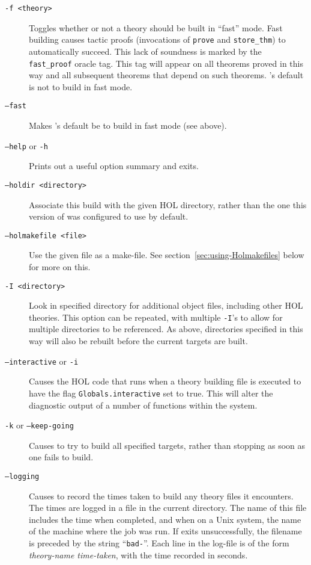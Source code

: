 \begin{description}
\item[\texttt{-f <theory>}] Toggles whether or not a theory should be
  built in ``fast'' mode.  Fast building causes tactic proofs
  (invocations of \texttt{prove} and \texttt{store\_thm}) to
  automatically succeed.  This lack of soundness is marked by the
  \texttt{fast\_proof} oracle tag.  This tag will appear on all
  theorems proved in this way and all subsequent theorems that depend
  on such theorems.  \holmake's default is not to build in fast mode.
\item[\texttt{--fast}] Makes \holmake's default be to build in fast
  mode (see above).
\item[{\tt --help} or {\tt -h}] Prints out a useful option summary and
  exits.
\item[\tt --holdir <directory>] Associate this build with the given
  HOL directory, rather than the one this version of \holmake{} was
  configured to use by default.
\item[\tt --holmakefile <file>] Use the given file as a make-file.
  See section~\ref{sec:using-Holmakefiles} below for more on this.
\item[\tt -I <directory>]
  Look in specified directory for additional object files, including other HOL theories.
  This option can be repeated, with multiple {\tt -I}'s to allow for multiple directories to be referenced.
  As above, directories specified in this way will also be rebuilt before the current targets are built.
\item[\texttt{--interactive} or \texttt{-i}] Causes the HOL code that
  runs when a theory building file is executed to have the flag
  \texttt{Globals.interactive} set to true.  This will alter the diagnostic
  output of a number of functions within the system.
\item[\texttt{-k} or \texttt{--keep-going}] Causes \holmake{} to try
  to build all specified targets, rather than stopping as soon as one
  fails to build.
\item[\texttt{--logging}] Causes \holmake{} to record the times taken
  to build any theory files it encounters.  The times are logged in a
  file in the current directory.  The name of this file includes the
  time when \holmake{} completed, and when on a Unix system, the name
  of the machine where the job was run.  If \holmake{} exits
  unsuccessfully, the filename is preceded by the string
  ``\texttt{bad-}''. Each line in the log-file is of the form
  \textit{theory-name time-taken}, with the time recorded in seconds.

\end{description}
